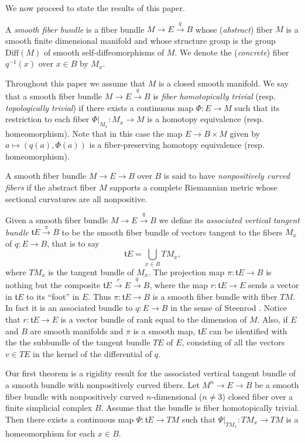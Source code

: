 \documentclass[onecolumn,notitlepage,11pt]{article}
\newcommand{\beq}{\begin{equation*}}
\newcommand{\eeq}{\end{equation*}}
\newenvironment{customthm}[1]
  {\renewcommand\theinnercustomthm{#1}\innercustomthm}
  {\endinnercustomthm}  %
\theoremstyle{definition}
\begin{document}
We now proceed to state the results of this paper.

A \textit{smooth fiber bundle} is a fiber bundle 
$M\to E\xrightarrow{q} B$
whose (\textit{abstract}) fiber $M$
is a smooth finite dimensional manifold and 
whose structure group is
the group $\mbox{Diff}(M)$ of smooth
self-diffeomorphisms of $M$. We denote the
(\textit{concrete}) fiber $q^{-1}(x)$ over $x\in B$ by $M_x$.

Throughout this paper we assume that $M$ is a closed smooth manifold.
We say that a smooth fiber bundle $M\to E\xrightarrow{q} B$ 
is \textit{fiber homotopically trivial} (resp. \textit{topologically trivial})
if there exists a continuous map
$\Phi:E\to M$ such that its restriction to each
fiber $\Phi|_{M_x}:M_x\to M$ is a homotopy equivalence (resp. homeomorphism). Note that in this case the map
$E\to B\times M$ given by $a\mapsto (q(a),\Phi(a))$ 
is a fiber-preserving homotopy equivalence (resp. homeomorphism).

A smooth fiber bundle
$M\to E\to B$ over $B$ is said to have
\textit{nonpositively curved fibers} if
the abstract fiber $M$ supports
a complete Riemannian metric whose sectional curvatures are all nonpositive. 

Given a smooth fiber bundle $M\to E\xrightarrow{q} B$ we define its 
\textit{associated vertical tangent bundle} $\mathfrak{t}E\xrightarrow{\pi} B$
to be the smooth fiber bundle of vectors tangent to the fibers
$M_x$ of $q:E\to B$, that is to say
\beq
\mathfrak{t}E=\bigcup_{x\in B}TM_x,
\eeq
where $TM_x$ is the tangent bundle of $M_x$. 
The projection map $\pi:\mathfrak{t}E\to B$
is nothing but the composite 
$\mathfrak{t}E\xrightarrow{r} E\xrightarrow{q} B$,
where the map $r:\mathfrak{t}E\to E$ sends
a vector in $\mathfrak{t}E$ to its ``foot'' in $E$. 
Thus $\pi:\mathfrak{t}E\to B$ is a smooth fiber
bundle with fiber $TM$. In fact it is an associated bundle to 
$q:E\to B$ in the sense of Steenrod \cite[p. 43]{steenrod}.
Notice that $r:\mathfrak{t}E\to E$ is a vector
bundle of rank equal to the dimension of $M$. 
Also, if $E$ and $B$ are 
smooth manifolds and $\pi$ is a smooth map, $\mathfrak{t}E$
can be identified with the the subbundle of the tangent bundle $TE$
of $E$, consisting of all the vectors $v\in TE$ in the kernel of
the differential of $q$.

Our first theorem is a rigidity result
for the associated vertical tangent bundle 
of a smooth bundle with nonpositively curved fibers.
\begin{customthm}{A}\label{main1}
Let $M^n\to E\to B$ be a smooth fiber bundle with
nonpositively curved $n$-dimensional ($n\neq 3$) closed fiber
over a finite simplicial complex $B$. 
Assume that the bundle is
fiber homotopically trivial.
Then there exists a continuous map
$\Psi: \mathfrak{t}E\to TM$ such that $\Psi|_{TM_x}:TM_x\to TM$ 
is a homeomorphism for each $x\in B$.
\end{customthm} 
\end{document}
